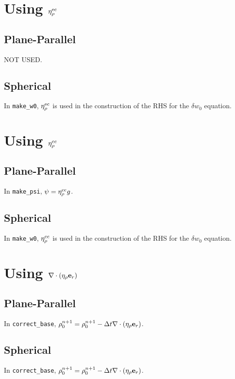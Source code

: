 \section{Using $\eta_{\rho}^{\rm ec}$}
\subsection{Plane-Parallel}
NOT USED.

\subsection{Spherical}
In {\tt make\_w0}, $\eta_{\rho}^{\rm ec}$ is used in the construction of the RHS
for the $\delta w_0$ equation.

\section{Using $\eta_{\rho}^{\rm cc}$}
\subsection{Plane-Parallel}
In {\tt make\_psi}, $\psi = \eta_{\rho}^{\rm cc} g$.

\subsection{Spherical}
In {\tt make\_w0}, $\eta_{\rho}^{\rm cc}$ is used in the construction of the RHS
for the $\delta w_0$ equation.

\section{Using $\nabla\cdot(\eta_{\rho}{\bf e}_r)$}
\subsection{Plane-Parallel}
In {\tt correct\_base}, $\rho_0^{n+1} = \rho_0^{n+1} - \Delta t \nabla\cdot(\eta_{\rho}{\bf e}_r)$.

\subsection{Spherical}
In {\tt correct\_base}, $\rho_0^{n+1} = \rho_0^{n+1} - \Delta t \nabla\cdot(\eta_{\rho}{\bf e}_r)$. \\

